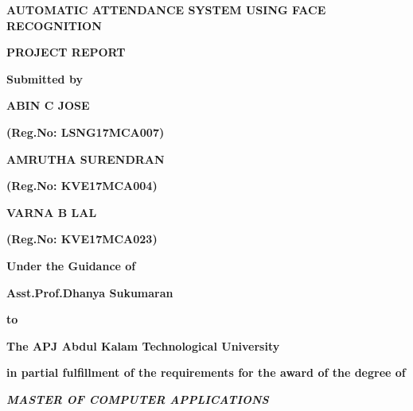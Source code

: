 \documentclass[a4paper, 12pt]{report}
\begin{document}


\begin{titlepage}
	\centering
	\vspace{.4cm}
	{\bfseries\fontsize{16pt}{16pt}\selectfont AUTOMATIC ATTENDANCE SYSTEM USING FACE RECOGNITION \par}
	\vspace{.6cm}
	{\bfseries\fontsize{12pt}{12pt}\selectfont  PROJECT REPORT \par}
	\vspace{.6cm}
	
	{\fontsize{12pt}{12pt}\selectfont\bfseries Submitted by \par}
	\vspace{.6cm}
	{\fontsize{14pt}{14pt}\selectfont\bfseries ABIN C JOSE}
		{\fontsize{12pt}{12pt}\selectfont\bfseries (Reg.No: LSNG17MCA007)\par}
	\vspace{.6cm}
	{\fontsize{14pt}{14pt}\selectfont\bfseries\hspace{3cm} AMRUTHA SURENDRAN}
		{\fontsize{12pt}{12pt}\selectfont\bfseries (Reg.No: KVE17MCA004)\par}
	\vspace{.6cm}
	{\fontsize{14pt}{14pt}\selectfont\bfseries VARNA B LAL}
		{\fontsize{12pt}{12pt}\selectfont\bfseries (Reg.No: KVE17MCA023)\par}
	\vspace{.4cm}
		
	{\fontsize{14pt}{14pt}\selectfont\bfseries Under the Guidance of\par}
	\vspace{.3cm}
		{\fontsize{14pt}{14pt}\selectfont\bfseries Asst.Prof.Dhanya Sukumaran\par}
	\vspace{.3cm}
	{\fontsize{12pt}{12pt}\selectfont\bfseries  to \par}
	\vspace{.2cm}
	{\bfseries\fontsize{12pt}{12pt}\selectfont The APJ Abdul Kalam Technological University \par}
	\vspace{.2cm}	
	{\fontsize{12pt}{12pt}\selectfont\bfseries {in partial fulfillment of the requirements for the award of the degree of} \par}	
	\vspace{.4cm}
	{\bfseries\fontsize{12pt}{12pt}\selectfont\bfseries \textit { MASTER OF COMPUTER APPLICATIONS } \par}
	

\end{titlepage}
\end{document}
